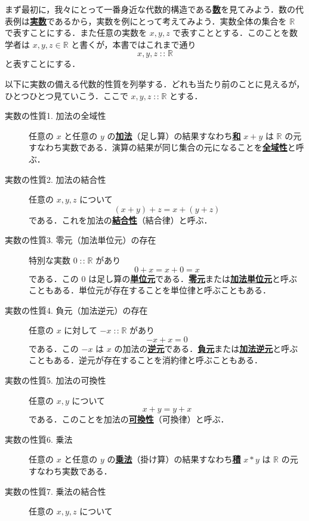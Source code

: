 \documentclass[a4paper,twocolumn]{jsbook}
\newcommand{\keyword}[1]{{\underline{\textbf{#1}}}}
\DeclareMathOperator{\mIn}{{:\!:}}
\newcommand{\mSpecialSet}[1]{\mathbb{#1}} %
\newcommand{\mRSet}{\mSpecialSet{R}}
\begin{document}
まず最初に，我々にとって一番身近な代数的構造である\keyword{数}を見てみよう．数の代表例は\keyword{実数}であるから，実数を例にとって考えてみよう．実数全体の集合を $\mRSet$ で表すことにする．また任意の実数を $x,y,z$ で表すこととする．このことを数学者は $x,y,z\in\mRSet$ と書くが，本書ではこれまで通り
\begin{equation}
x,y,z\mIn\mRSet
\end{equation}
と表すことにする．

以下に実数の備える代数的性質を列挙する．どれも当たり前のことに見えるが，ひとつひとつ見ていこう．ここで $x,y,z\mIn\mRSet$ とする．
\begin{description}
\item[実数の性質1. 加法の全域性] 任意の $x$ と任意の $y$ の\keyword{加法}（足し算）の結果すなわち\keyword{和} $x+y$ は $\mRSet$ の元すなわち実数である．演算の結果が同じ集合の元になることを\keyword{全域性}と呼ぶ．
\item[実数の性質2. 加法の結合性] 任意の $x,y,z$ について
\begin{equation}
(x+y)+z=x+(y+z)
\end{equation}
である．これを加法の\keyword{結合性}（結合律）と呼ぶ．
\item[実数の性質3. 零元（加法単位元）の存在] 特別な実数 $0\mIn\mRSet$ があり
\begin{equation}
0+x=x+0=x
\end{equation}
である．この $0$ は足し算の\keyword{単位元}である．\keyword{零元}または\keyword{加法単位元}と呼ぶこともある．単位元が存在することを単位律と呼ぶこともある．
\item[実数の性質4. 負元（加法逆元）の存在] 任意の $x$ に対して $-x\mIn\mRSet$ があり
\begin{equation}
-x+x=0
\end{equation}
である．この $-x$ は $x$ の加法の\keyword{逆元}である．\keyword{負元}または\keyword{加法逆元}と呼ぶこともある．逆元が存在することを消約律と呼ぶこともある．
\item[実数の性質5. 加法の可換性] 任意の $x,y$ について
\begin{equation}
x+y=y+x
\end{equation}
である．このことを加法の\keyword{可換性}（可換律）と呼ぶ．
\item[実数の性質6. 乗法] 任意の $x$ と任意の $y$ の\keyword{乗法}（掛け算）の結果すなわち\keyword{積} $x*y$ は $\mRSet$ の元すなわち実数である．
\item[実数の性質7. 乗法の結合性] 任意の $x,y,z$ について
\begin{equation}

\end{equation}
\end{description}
\end{document}
